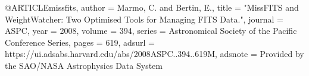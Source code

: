 
@ARTICLE{missfits,
       author = {{Marmo}, C. and {Bertin}, E.},
        title = "{MissFITS and WeightWatcher: Two Optimised Tools for Managing FITS Data.}",
      journal = {ASPC},
         year = 2008,
       volume = {394},
       series = {Astronomical Society of the Pacific Conference Series},
        pages = {619},
       adsurl = {https://ui.adsabs.harvard.edu/abs/2008ASPC..394..619M},
      adsnote = {Provided by the SAO/NASA Astrophysics Data System}
}
